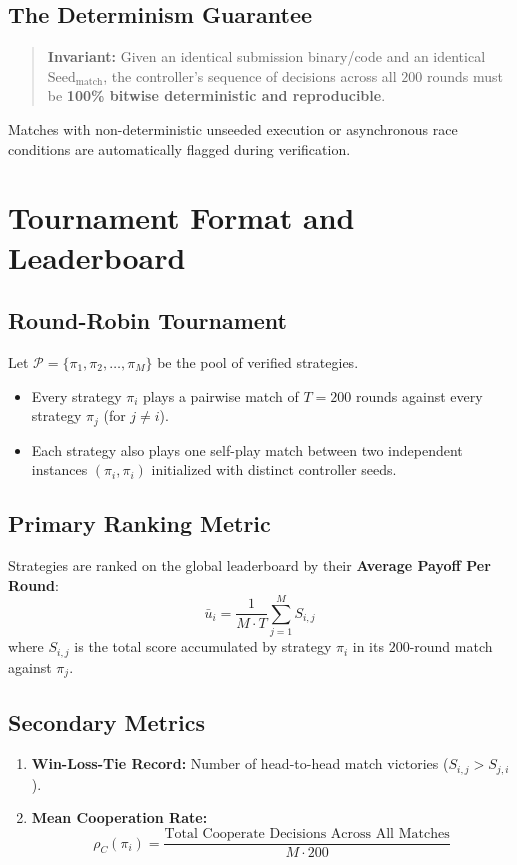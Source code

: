 \documentclass[11pt,a4paper]{article}
\begin{document}
\subsection{The Determinism Guarantee}
\begin{quote}
\textbf{Invariant:} Given an identical submission binary/code and an identical $\text{Seed}_{\text{match}}$, the controller's sequence of decisions across all $200$ rounds must be \textbf{100\% bitwise deterministic and reproducible}.
\end{quote}
Matches with non-deterministic unseeded execution or asynchronous race conditions are automatically flagged during verification.


\section{Tournament Format and Leaderboard}

\subsection{Round-Robin Tournament}
Let $\mathcal{P} = \{\pi_1, \pi_2, \dots, \pi_M\}$ be the pool of verified strategies.
\begin{itemize}
    \item Every strategy $\pi_i$ plays a pairwise match of $T = 200$ rounds against every strategy $\pi_j$ (for $j \neq i$).
    \item Each strategy also plays one self-play match between two independent instances $(\pi_i, \pi_i)$ initialized with distinct controller seeds.
\end{itemize}

\subsection{Primary Ranking Metric}
Strategies are ranked on the global leaderboard by their \textbf{Average Payoff Per Round}:
\[
\bar{u}_i = \frac{1}{M \cdot T} \sum_{j=1}^M S_{i,j}
\]
where $S_{i,j}$ is the total score accumulated by strategy $\pi_i$ in its $200$-round match against $\pi_j$.

\subsection{Secondary Metrics}
\begin{enumerate}
    \item \textbf{Win-Loss-Tie Record:} Number of head-to-head match victories ($S_{i,j} > S_{j,i}$).
    \item \textbf{Mean Cooperation Rate:}
    \[
    \rho_C(\pi_i) = \frac{\text{Total Cooperate Decisions Across All Matches}}{M \cdot 200}
    \]
\end{enumerate}
\end{document}
